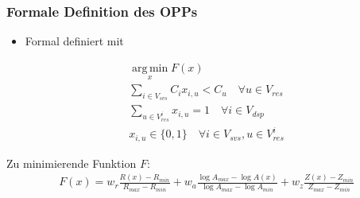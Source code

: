 \documentclass{beamer}
\begin{document}
\begin{frame}
\frametitle{Formale Definition des OPPs}
\begin{itemize}
    \item Formal definiert mit
\end{itemize}
\begin{center}
\[
\begin{gathered}
    \operatorname*{arg\,min}_x F(x) \\
    \sum_{i \in V_{svs}} C_i x_{i,u} < C_u \quad \forall u \in V_{res} \\ %
    \sum_{u \in V_{res}^i} x_{i,u} = 1 \quad \forall i \in V_{dsp} \\ %
    x_{i,u} \in \{0,1\} \quad \forall i \in V_{svs}, u \in V_{res}^i
\end{gathered}
\]
\item Zu minimierende Funktion $F$:
\[
\begin{gathered}
    F(x) = w_r \frac{R(x) - R_{min}}{R_{max} - R_{min}} 
    + w_a \frac{\log A_{max} - \log A(x)}{\log A_{max} - \log A_{min}} 
    + w_z \frac{Z(x) - Z_{min}}{Z_{max} - Z_{min}} 
\end{gathered} \label{to-minimize-function}
\]
\end{center}
\end{frame}

\end{document}
